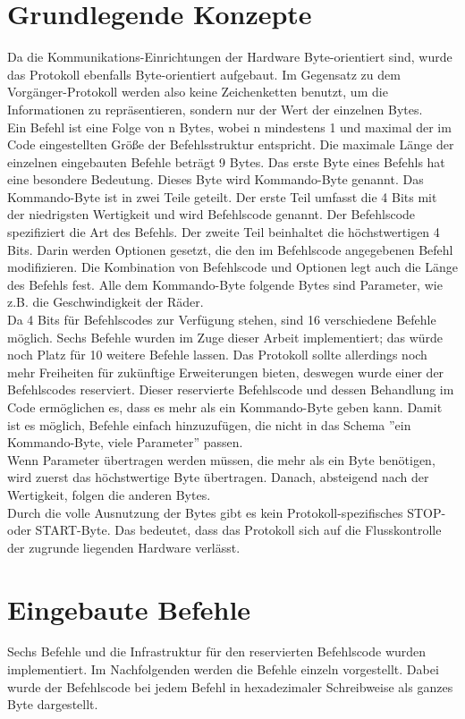 \section{Grundlegende Konzepte}
Da die Kommunikations-Einrichtungen der Hardware Byte-orientiert sind, wurde das
Protokoll ebenfalls Byte-orientiert aufgebaut. Im Gegensatz zu dem Vorgänger-Protokoll
werden also keine Zeichenketten benutzt, um die Informationen zu repräsentieren, sondern
nur der Wert der einzelnen Bytes.\\
Ein Befehl ist eine Folge von n Bytes, wobei n mindestens 1 und maximal der im Code
eingestellten Größe der Befehlsstruktur entspricht. 
Die maximale Länge der einzelnen eingebauten Befehle beträgt 9 Bytes.
Das erste Byte eines Befehls hat eine
besondere Bedeutung. Dieses Byte wird Kommando-Byte genannt. Das Kommando-Byte
ist in zwei Teile geteilt. Der erste Teil umfasst die 4 Bits mit der niedrigsten Wertigkeit und
wird Befehlscode genannt. Der Befehlscode spezifiziert die Art des Befehls.
Der zweite Teil beinhaltet die höchstwertigen 4 Bits. Darin werden Optionen
gesetzt, die den im Befehlscode angegebenen Befehl modifizieren. Die Kombination
von Befehlscode und Optionen legt auch die Länge des Befehls fest. Alle dem
Kommando-Byte folgende Bytes sind Parameter, wie z.B. die Geschwindigkeit der Räder.\\
Da 4 Bits für Befehlscodes zur Verfügung stehen, sind 16 verschiedene Befehle möglich.
Sechs Befehle wurden im Zuge dieser Arbeit implementiert; das würde noch Platz für
10 weitere Befehle lassen. Das Protokoll sollte allerdings noch mehr Freiheiten
für zukünftige Erweiterungen bieten, deswegen wurde einer der Befehlscodes
reserviert. Dieser reservierte Befehlscode und dessen Behandlung im Code ermöglichen
es, dass es mehr als ein Kommando-Byte geben kann. Damit ist es möglich, Befehle einfach 
hinzuzufügen, die nicht in das Schema ''ein Kommando-Byte, viele Parameter'' passen.\\
Wenn Parameter übertragen werden müssen, die mehr als ein Byte benötigen, wird zuerst
das höchstwertige Byte übertragen. Danach, absteigend nach der Wertigkeit, folgen die anderen
Bytes.\\
Durch die volle Ausnutzung der Bytes gibt es kein Protokoll-spezifisches STOP- oder START-Byte.
Das bedeutet, dass das Protokoll sich auf die Flusskontrolle der zugrunde liegenden Hardware
verlässt.

\section{Eingebaute Befehle}
Sechs Befehle und die Infrastruktur für den reservierten Befehlscode wurden implementiert.
Im Nachfolgenden werden die Befehle einzeln vorgestellt. Dabei wurde der Befehlscode bei
jedem Befehl in hexadezimaler Schreibweise als ganzes Byte dargestellt.

